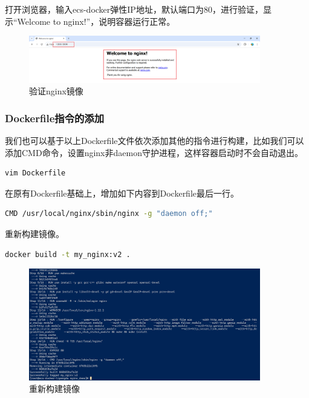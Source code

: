 \documentclass{article}
\begin{document}
打开浏览器，输入ecs-docker弹性IP地址，默认端口为80，进行验证，显示“Welcome to nginx!”，说明容器运行正常。

\begin{figure}[H]
\centering
\includegraphics[width=0.9\textwidth]{img/0.2.7.2.2.png}
\caption{验证nginx镜像}
\end{figure}

\subsubsection{Dockerfile指令的添加}

我们也可以基于以上Dockerfile文件依次添加其他的指令进行构建，比如我们可以添加CMD命令，设置nginx非daemon守护进程，这样容器启动时不会自动退出。

\begin{lstlisting}[language=bash]
    vim Dockerfile
\end{lstlisting}

在原有Dockerfile基础上，增加如下内容到Dockerfile最后一行。

\begin{lstlisting}[language=bash]
    CMD /usr/local/nginx/sbin/nginx -g "daemon off;"
\end{lstlisting}

重新构建镜像。

\begin{lstlisting}[language=bash]
    docker build -t my_nginx:v2 .
\end{lstlisting}

\begin{figure}[H]
\centering
\includegraphics[width=0.9\textwidth]{img/2.7.3.1.png}
\caption{重新构建镜像}
\end{figure}
\end{document}
